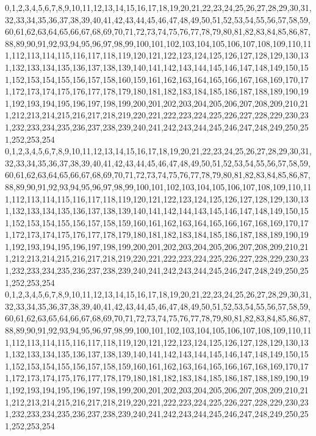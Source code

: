 \documentclass[12pt]{article}
\begin{document}
{0,1,2,3,4,5,6,7,8,9,10,11,12,13,14,15,16,17,18,19,20,21,22,23,24,25,26,27,28,29,30,31,32,33,34,35,36,37,38,39,40,41,42,43,44,45,46,47,48,49,50,51,52,53,54,55,56,57,58,59,60,61,62,63,64,65,66,67,68,69,70,71,72,73,74,75,76,77,78,79,80,81,82,83,84,85,86,87,88,89,90,91,92,93,94,95,96,97,98,99,100,101,102,103,104,105,106,107,108,109,110,111,112,113,114,115,116,117,118,119,120,121,122,123,124,125,126,127,128,129,130,131,132,133,134,135,136,137,138,139,140,141,142,143,144,145,146,147,148,149,150,151,152,153,154,155,156,157,158,160,159,161,162,163,164,165,166,167,168,169,170,171,172,173,174,175,176,177,178,179,180,181,182,183,184,185,186,187,188,189,190,191,192,193,194,195,196,197,198,199,200,201,202,203,204,205,206,207,208,209,210,211,212,213,214,215,216,217,218,219,220,221,222,223,224,225,226,227,228,229,230,231,232,233,234,235,236,237,238,239,240,241,242,243,244,245,246,247,248,249,250,251,252,253,254\\
0,1,2,3,4,5,6,7,8,9,10,11,12,13,14,15,16,17,18,19,20,21,22,23,24,25,26,27,28,29,30,31,32,33,34,35,36,37,38,39,40,41,42,43,44,45,46,47,48,49,50,51,52,53,54,55,56,57,58,59,60,61,62,63,64,65,66,67,68,69,70,71,72,73,74,75,76,77,78,79,80,81,82,83,84,85,86,87,88,89,90,91,92,93,94,95,96,97,98,99,100,101,102,103,104,105,106,107,108,109,110,111,112,113,114,115,116,117,118,119,120,121,122,123,124,125,126,127,128,129,130,131,132,133,134,135,136,137,138,139,140,141,142,144,143,145,146,147,148,149,150,151,152,153,154,155,156,157,158,159,160,161,162,163,164,165,166,167,168,169,170,171,172,173,174,175,176,177,178,179,180,181,182,183,184,185,186,187,188,189,190,191,192,193,194,195,196,197,198,199,200,201,202,203,204,205,206,207,208,209,210,211,212,213,214,215,216,217,218,219,220,221,222,223,224,225,226,227,228,229,230,231,232,233,234,235,236,237,238,239,240,241,242,243,244,245,246,247,248,249,250,251,252,253,254\\
0,1,2,3,4,5,6,7,8,9,10,11,12,13,14,15,16,17,18,19,20,21,22,23,24,25,26,27,28,29,30,31,32,33,34,35,36,37,38,39,40,41,42,43,44,45,46,47,48,49,50,51,52,53,54,55,56,57,58,59,60,61,62,63,65,64,66,67,68,69,70,71,72,73,74,75,76,77,78,79,80,81,82,83,84,85,86,87,88,89,90,91,92,93,94,95,96,97,98,99,100,101,102,103,104,105,106,107,108,109,110,111,112,113,114,115,116,117,118,119,120,121,122,123,124,125,126,127,128,129,130,131,132,133,134,135,136,137,138,139,140,141,142,143,144,145,146,147,148,149,150,151,152,153,154,155,156,157,158,159,160,161,162,163,164,165,166,167,168,169,170,171,172,173,174,175,176,177,178,179,180,181,182,183,184,185,186,187,188,189,190,191,192,193,194,195,196,197,198,199,200,201,202,203,204,205,206,207,208,209,210,211,212,213,214,215,216,217,218,219,220,221,222,223,224,225,226,227,228,229,230,231,232,233,234,235,236,237,238,239,240,241,242,243,244,245,246,247,248,249,250,251,252,253,254\\
}
\end{document}
